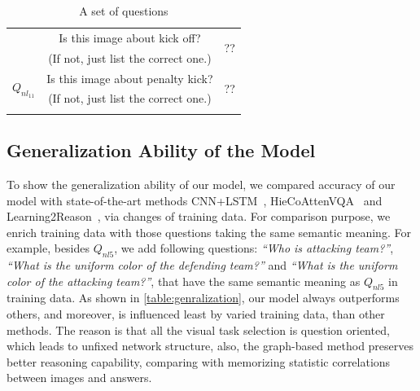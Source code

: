 \begin{table}[thb]
\begin{center}
\begin{tabular}{c|c|c}
{			\multirow{2}{*}{$Q_{nl_{10}}$}  &  Is this image about kick off?  &  \multirow{2}{*}{\color{red}??}    \\ 
			& {\color{red}(If not, just list the correct one.)}  &  \\ \hline
			
			\multirow{2}{*}{$Q_{nl_{11}}$}  &   Is this image about penalty kick?  &  \multirow{2}{*}{\color{red}??}    \\ 
			& {\color{red}(If not, just list the correct one.)}  &  \\ %
			\Xhline{1pt}
			}
		\end{tabular}
		\caption{A set of questions}
		\label{table:questions}
	\end{center}
\end{table}

\vspace{-3ex}
\subsection{Generalization Ability of the Model}

To show the generalization ability of our model, we compared accuracy of our model with state-of-the-art methods CNN+LSTM~\cite{VQA}, HieCoAttenVQA~\cite{Lu2016Hie} and Learning2Reason~\cite{hu2017learning}, via changes of training data. For comparison purpose, we enrich training data with those questions taking the same semantic meaning. For example, besides $Q_{nl5}$, we add following questions: \textit{``Who is attacking team?''}, \textit{``What is the uniform color of the defending team?''} and \textit{``What is the uniform color of the attacking team?''}, that have the same semantic meaning as $Q_{nl5}$ in training data. As shown in \cref{table:genralization}, our model always outperforms others, and moreover, is influenced least by varied training data, than other methods. The reason is that all the visual task selection is question oriented, which leads to unfixed network structure, also, the graph-based method preserves better reasoning capability, comparing with memorizing statistic correlations between images and answers.



